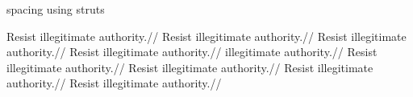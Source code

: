 \ex spacing using struts
\smallskip

\leavevmode
\begingl[glstyle=wrap,everygla=\ninerm,everyglb=\tenrm,
   everyglc=\elevenrm,everygld=\twelverm,everygle=\twelvebf,everyglf=\ninerm,
   everyglword={\baselineskip=0pt \lineskip=.3ex}]
\gla Resist illegitimate authority.//
\glb Resist illegitimate authority.//
\glc Resist illegitimate authority.//
\gld Resist illegitimate authority.//
 illegitimate authority.//
\gld Resist illegitimate authority.//
\glc Resist illegitimate authority.//
\glb Resist illegitimate authority.//
\glf Resist illegitimate authority.//
\endgl
\xe

